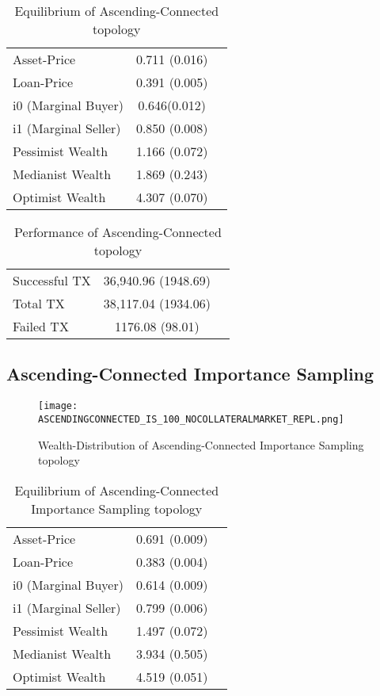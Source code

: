 \documentclass[Bachelorarbeit.tex]{subfiles}
\begin{document}
\begin{table}[h]
	\caption{Equilibrium of Ascending-Connected topology}
	\centering
	\begin{tabular} { l c r }
		\hline
		Asset-Price & 0.711 (0.016) \\
		Loan-Price & 0.391 (0.005) \\
		i0 (Marginal Buyer) & 0.646(0.012) \\
		i1 (Marginal Seller) & 0.850 (0.008) \\
		Pessimist Wealth & 1.166 (0.072) \\
		Medianist Wealth & 1.869 (0.243) \\
		Optimist Wealth & 4.307 (0.070) \\
		\hline
	\end{tabular}
\end{table} 

\begin{table}[h]
	\caption{Performance of Ascending-Connected topology}
	\centering
	\begin{tabular} { l c r }
		\hline
		Successful TX & 36,940.96 (1948.69) \\
		Total TX & 38,117.04 (1934.06) \\
		Failed TX & 1176.08 (98.01) \\
		\hline
	\end{tabular}
\end{table}

\subsection{Ascending-Connected Importance Sampling}
\begin{figure}[H]
	\centering
  \texttt{[image: ASCENDINGCONNECTED\_IS\_100\_NOCOLLATERALMARKET\_REPL.png]}
	\caption{Wealth-Distribution of Ascending-Connected Importance Sampling topology}
	\label{fig:wealth_ASCENDINGCONNECTED_IS_100_NOCOLLATERALMARKET_REPL}
\end{figure}

\begin{table}[h]
	\caption{Equilibrium of Ascending-Connected Importance Sampling topology}
	\centering
	\begin{tabular} { l c r }
		\hline
		Asset-Price & 0.691 (0.009) \\
		Loan-Price & 0.383 (0.004) \\
		i0 (Marginal Buyer) & 0.614 (0.009) \\
		i1 (Marginal Seller) & 0.799 (0.006) \\
		Pessimist Wealth & 1.497 (0.072) \\
		Medianist Wealth & 3.934 (0.505) \\
		Optimist Wealth & 4.519 (0.051) \\
		\hline
	\end{tabular}
\end{table} 
\end{document}
